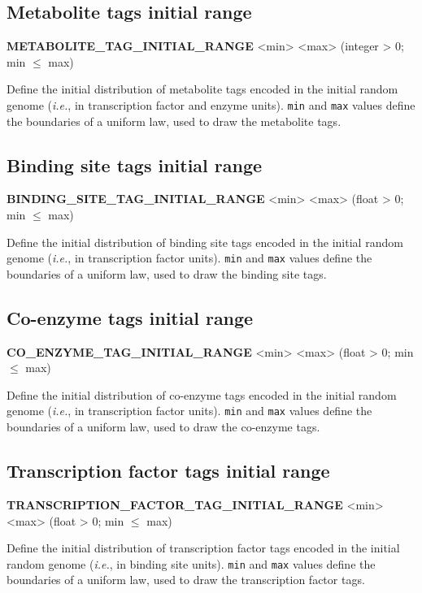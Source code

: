 
\subsection{Metabolite tags initial range}
\begin{center}
{\bf METABOLITE\_TAG\_INITIAL\_RANGE} <min> <max> (integer > 0; min $\le$ max)
\end{center}
Define the initial distribution of metabolite tags encoded in the initial random genome (\textit{i.e.}, in transcription factor and enzyme units). \texttt{min} and \texttt{max} values define the boundaries of a uniform law, used to draw the metabolite tags.


\subsection{Binding site tags initial range}
\begin{center}
{\bf BINDING\_SITE\_TAG\_INITIAL\_RANGE} <min> <max> (float > 0; min $\le$ max)
\end{center}
Define the initial distribution of binding site tags encoded in the initial random genome (\textit{i.e.}, in transcription factor units). \texttt{min} and \texttt{max} values define the boundaries of a uniform law, used to draw the binding site tags.


\subsection{Co-enzyme tags initial range}
\begin{center}
{\bf CO\_ENZYME\_TAG\_INITIAL\_RANGE} <min> <max> (float > 0; min $\le$ max)
\end{center}
Define the initial distribution of co-enzyme tags encoded in the initial random genome (\textit{i.e.}, in transcription factor units). \texttt{min} and \texttt{max} values define the boundaries of a uniform law, used to draw the co-enzyme tags.


\subsection{Transcription factor tags initial range}
\begin{center}
{\bf TRANSCRIPTION\_FACTOR\_TAG\_INITIAL\_RANGE} <min> <max> (float > 0; min $\le$ max)
\end{center}
Define the initial distribution of transcription factor tags encoded in the initial random genome (\textit{i.e.}, in binding site units). \texttt{min} and \texttt{max} values define the boundaries of a uniform law, used to draw the transcription factor tags.

